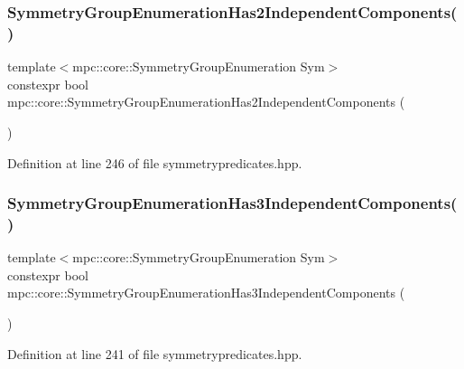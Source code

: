 \subsubsection{\texorpdfstring{Symmetry\+Group\+Enumeration\+Has2\+Independent\+Components()}{SymmetryGroupEnumerationHas2IndependentComponents()}}
{\footnotesize\ttfamily template$<$mpc\+::core\+::\+Symmetry\+Group\+Enumeration Sym$>$ \\
constexpr bool mpc\+::core\+::\+Symmetry\+Group\+Enumeration\+Has2\+Independent\+Components (\begin{DoxyParamCaption}{ }\end{DoxyParamCaption})\hspace{0.3cm}{\ttfamily [inline]}}



Definition at line 246 of file symmetrypredicates.\+hpp.

\mbox{\label{namespacempc_1_1core_a794af450ca75ce367faa0f0a282ff54d}} 
\subsubsection{\texorpdfstring{Symmetry\+Group\+Enumeration\+Has3\+Independent\+Components()}{SymmetryGroupEnumerationHas3IndependentComponents()}}
{\footnotesize\ttfamily template$<$mpc\+::core\+::\+Symmetry\+Group\+Enumeration Sym$>$ \\
constexpr bool mpc\+::core\+::\+Symmetry\+Group\+Enumeration\+Has3\+Independent\+Components (\begin{DoxyParamCaption}{ }\end{DoxyParamCaption})\hspace{0.3cm}{\ttfamily [inline]}}



Definition at line 241 of file symmetrypredicates.\+hpp.

\mbox{\label{namespacempc_1_1core_af0e68c831123f9f34edf807434016e77}} 

